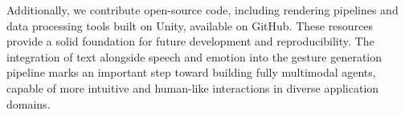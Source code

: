 Additionally, we contribute open-source code, including rendering pipelines and data processing tools built on Unity, available on GitHub. These resources provide a solid foundation for future development and reproducibility. The integration of text alongside speech and emotion into the gesture generation pipeline marks an important step toward building fully multimodal agents, capable of more intuitive and human-like interactions in diverse application domains.

\newpage
\newpage

%


